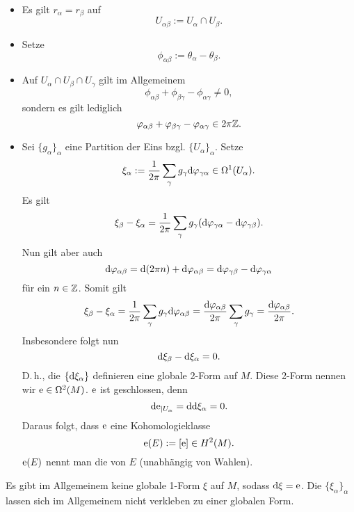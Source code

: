 \begin{itemize}
	\item Es gilt $r_\alpha = r_\beta$ auf
	\[ U_{\alpha \beta} := U_\alpha \cap U_\beta. \]
	\item Setze
	\[ \phi_{\alpha \beta} := \theta_\alpha - \theta_\beta. \]
	\item Auf $U_\alpha \cap U_\beta \cap U_\gamma$ gilt im Allgemeinem
	\[  \phi_{\alpha \beta} + \phi_{\beta \gamma} - \phi_{\alpha \gamma} \neq 0, \]
	sondern es gilt lediglich
	\[ \varphi_{\alpha \beta} + \varphi_{\beta \gamma} - \varphi_{\alpha \gamma} \in 2\pi \mathbb{Z}. \]
	\item Sei $\{g_\alpha\}_\alpha$ eine Partition der Eins bzgl. $\{U_\alpha\}_\alpha$. Setze
	\[ \xi_\alpha := \frac{1}{2\pi} \sum_\gamma g_\gamma \text{d} \varphi_{\gamma\alpha} \in \Omega^1(U_\alpha). \]
	Es gilt
	\[ \xi_\beta - \xi_\alpha = \frac{1}{2\pi} \sum_\gamma g_\gamma (\text{d} \varphi_{\gamma\alpha} - \text{d} \varphi_{\gamma\beta}). \]
	Nun gilt aber auch
	\[ \text{d} \varphi_{\alpha \beta} = \text{d} (2\pi n) + \text{d} \varphi_{\alpha \beta} = \text{d} \varphi_{\gamma\beta} - \text{d} \varphi_{\gamma\alpha} \]
	für ein $n \in \mathbb{Z}$. Somit gilt
	\[ \xi_\beta - \xi_\alpha = \frac{1}{2\pi} \sum_\gamma g_\gamma \text{d} \varphi_{\alpha\beta} = \frac{\text{d} \varphi_{\alpha\beta}}{2\pi} \sum_\gamma g_\gamma  = \frac{\text{d} \varphi_{\alpha\beta}}{2\pi} . \]
	Insbesondere folgt nun
	\[ \text{d}\xi_\beta - \text{d} \xi_\alpha = 0. \]
	D.\,h., die $\{ \text{d} \xi_\alpha \}$ definieren eine globale 2-Form auf $M$. Diese 2-Form nennen wir $\mathrm{e} \in \Omega^2(M)$. $\mathrm{e}$ ist geschlossen, denn
	\[ \text{d} \mathrm{e}_{|U_\alpha} = \text{d}\text{d} \xi_\alpha = 0. \]
	Daraus folgt, dass $\mathrm{e}$ eine Kohomologieklasse
	\[ \mathrm{e}(E) := [\mathrm{e}] \in H^2(M) .\]
	$\mathrm{e}(E)$ nennt man die  von $E$ (unabhängig von Wahlen).
\end{itemize}

\Bem{}
Es gibt im Allgemeinem keine globale 1-Form $\xi$ auf $M$, sodass $\text{d} \xi = \mathrm{e}$. Die $\{\xi_\alpha\}_{\alpha}$ lassen sich im Allgemeinem nicht verkleben zu einer globalen Form.

